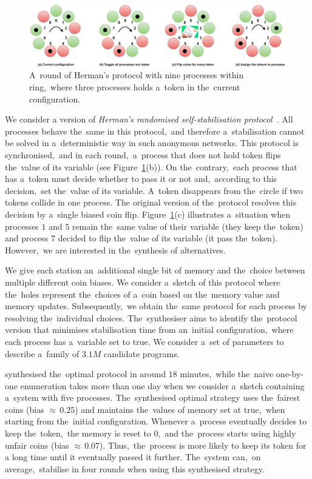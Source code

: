\begin{figure}[h!]
\centering
\includegraphics[width=1.0\textwidth]{figures/herman_coins.pdf}
\caption{A~round of Herman's protocol with nine processes within ring,~where three processes holds a~token in the~current configuration.}%
\label{fig:herman}%
\end{figure}

We consider a version of \textit{Herman's randomised self-stabilisation protocol}~\cite{herman1,herman2}.
All processes behave the~same in this protocol,~and therefore a~stabilisation cannot be solved in a~deterministic way in such anonymous networks.
This protocol is synchronised,~and in each round,~a~process that does not hold token flips the~value of its variable (see Figure~\ref{fig:herman}(b)).
On the~contrary,~each process that has a~token must decide whether to pass it or not and,~according to this decision,~set the~value of its variable.
A~token disappears from the~circle if two tokens collide in one process.
The original version of the~protocol resolves this decision by a~single biased coin flip.
Figure~\ref{fig:herman}(c) illustrates a~situation when processes $1$ and $5$ remain the~same value of their variable (they keep the~token) and process $7$ decided to flip the~value of its variable (it pass the~token).
However,~we are interested in the~synthesis of alternatives.

We give each station an~additional single bit of memory and the~choice between multiple different coin biases.
We consider a~sketch of this protocol where the~holes represent the~choices of a~coin based on the~memory value and memory updates.
Subsequently,~we obtain the~same protocol for each process by resolving the~individual choices.
The~synthesiser aims to identify the~protocol version that minimises stabilisation time from an~initial configuration,~where each process has a~variable set to true.
We consider a~set of parameters to describe a~family of $3.1M$ candidate programs.

\toolname{} synthesised the~optimal protocol in around $18$ minutes,~while the~naive one-by-one enumeration takes more than one day when we consider a~sketch containing a~system with five processes.
The~synthesised optimal strategy uses the~fairest coins (bias ${\approx} \, 0.25$) and maintains the~values of memory set at true,~when starting from the~initial configuration.
Whenever a~process eventually decides to keep the~token,~the memory is reset to $0$,~and the~process starts using highly unfair coins (bias ${\approx} \, 0.07$). 
Thus,~the~process is more likely to keep its token for a long time until it eventually passed it further.
The~system can,~on average,~stabilise in four rounds when using this synthesised strategy.

